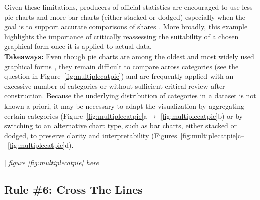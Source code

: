 \documentclass[11pt,twoside,a4paper]{article}
\begin{document}
 Given these limitations,  producers of official statistics are encouraged to use less pie charts and more bar charts (either stacked or dodged) especially when the goal is to support accurate comparisons of shares \citep{Schwabish2014}. More broadly, this example highlights the importance of critically reassessing the suitability of a chosen graphical form once it is applied to actual data. \\

\noindent \textbf{ Takeaways:} Even though pie charts are among the oldest and most widely used graphical forms \citep{Friendly2008}, they remain difficult to compare across categories (see the question in Figure~\ref{fig:multiplecatpie}) and are frequently applied with an excessive number of categories or without sufficient critical review after construction. Because the underlying distribution of categories in a dataset is not known a priori, it may be necessary to adapt the visualization by aggregating certain categories (Figure~\ref{fig:multiplecatpie}a$\rightarrow$ \ref{fig:multiplecatpie}b) or by switching to an alternative chart type, such as bar charts, either stacked or dodged, to preserve clarity and interpretability (Figures~\ref{fig:multiplecatpie}c–~\ref{fig:multiplecatpie}d).

\begin{center}
    [ \textit{figure \ref{fig:multiplecatpie}  here}  ]
\end{center}


\subsection*{Rule \#6: Cross The Lines}
\end{document}
